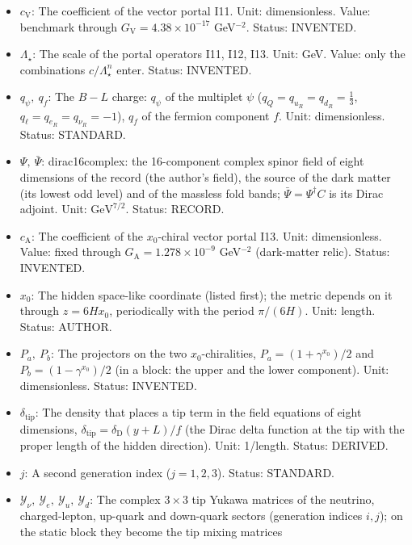 \documentclass[
  10pt,
]{article}
\begin{document}
\begin{itemize}
\item
  \(c_{\mathrm{V}}\): The coefficient of the vector portal I11. Unit:
  dimensionless. Value: benchmark through
  \(G_{\mathrm{V}} = 4.38\times10^{-17}\) GeV\(^{-2}\). Status:
  INVENTED.
\item
  \(\Lambda_\star\): The scale of the portal operators I11, I12, I13.
  Unit: GeV. Value: only the combinations \(c/\Lambda_\star^n\) enter.
  Status: INVENTED.
\item
  \(q_\psi,\ q_f\): The \(B - L\) charge: \(q_\psi\) of the multiplet
  \(\psi\) (\(q_Q = q_{u_R} = q_{d_R} = \frac13\),
  \(q_\ell = q_{e_R} = q_{\nu_R} = -1\)), \(q_f\) of the fermion
  component \(f\). Unit: dimensionless. Status: STANDARD.
\item
  \(\Psi,\ \bar\Psi\): dirac16complex: the 16-component complex spinor
  field of eight dimensions of the record (the author's field), the
  source of the dark matter (its lowest odd level) and of the massless
  fold bands; \(\bar\Psi = \Psi^\dagger C\) is its Dirac adjoint. Unit:
  \(\mathrm{GeV}^{7/2}\). Status: RECORD.
\item
  \(c_{\mathrm{A}}\): The coefficient of the \(x_0\)-chiral vector
  portal I13. Unit: dimensionless. Value: fixed through
  \(G_{\mathrm{A}} = 1.278\times10^{-9}\) GeV\(^{-2}\) (dark-matter
  relic). Status: INVENTED.
\item
  \(x_0\): The hidden space-like coordinate (listed first); the metric
  depends on it through \(z = 6Hx_0\), periodically with the period
  \(\pi/(6H)\). Unit: length. Status: AUTHOR.
\item
  \(P_a,\ P_b\): The projectors on the two \(x_0\)-chiralities,
  \(P_a = (1 + \gamma^{x_0})/2\) and \(P_b = (1 - \gamma^{x_0})/2\) (in
  a block: the upper and the lower component). Unit: dimensionless.
  Status: INVENTED.
\item
  \(\delta_{\mathrm{tip}}\): The density that places a tip term in the
  field equations of eight dimensions,
  \(\delta_{\mathrm{tip}} = \delta_{\mathrm{D}}(y + L)/f\) (the Dirac
  delta function at the tip with the proper length of the hidden
  direction). Unit: 1/length. Status: DERIVED.
\item
  \(j\): A second generation index (\(j = 1, 2, 3\)). Status: STANDARD.
\item
  \(\mathcal{Y}_\nu,\ \mathcal{Y}_e,\ \mathcal{Y}_u,\ \mathcal{Y}_d\):
  The complex \(3 \times 3\) tip Yukawa matrices of the neutrino,
  charged-lepton, up-quark and down-quark sectors (generation indices
  \(i, j\)); on the static block they become the tip mixing matrices

\end{itemize}
\end{document}
